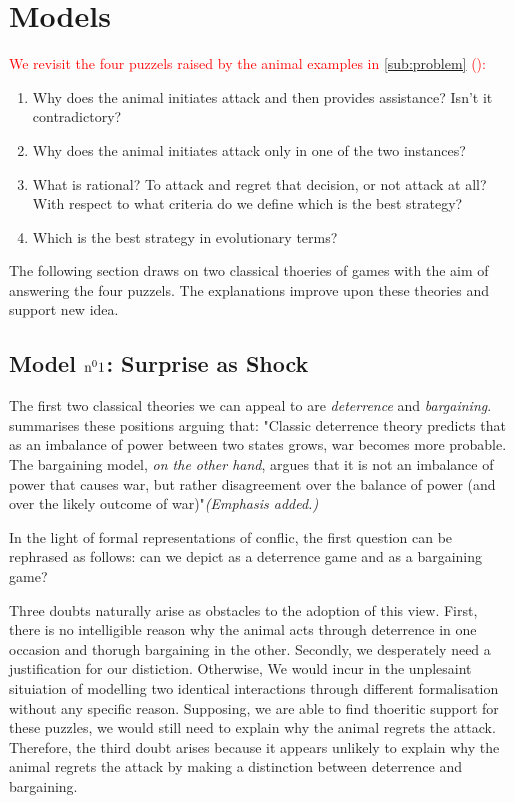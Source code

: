 
\section{Models}

\textcolor{red}{We revisit the four puzzels raised by the animal examples in \autoref{sub:problem} ():}

\begin{enumerate}
  \item Why does the animal initiates attack and then provides assistance? Isn't it contradictory?
  \item Why does the animal initiates attack only in one of the two instances?
  \item What is rational? To attack and regret that decision, or not attack at all? With respect to what criteria do we define which is the best strategy?
  \item Which is the best strategy in evolutionary terms?
\end{enumerate}

The following section draws on two classical thoeries of games with the aim of answering the four puzzels. The explanations improve upon these theories and support new idea.

\subsection{Model \(\text{n}^{{\small{0}}}1\): Surprise as Shock} \label{sub:model1}
The first two classical theories we can appeal to are \textit{deterrence} and \textit{bargaining}. \textcite{reiterExploringBargainingModel2003} summarises these positions arguing that: "Classic deterrence theory predicts that as an imbalance of power between two states grows, war becomes more probable. The bargaining model, \textit{on the other hand}, argues that it is not an imbalance of power that causes war, but rather disagreement over the balance of power (and over the likely outcome of war)"\textit{\small{(Emphasis added.)}}

\vspace*{1em}
In the light of formal representations of conflic, the first question can be rephrased as follows: can we depict  as a deterrence game and   as a bargaining game?

\vspace*{1em}
Three doubts naturally arise as obstacles to the adoption of this view.
First, there is no intelligible reason why the animal acts through deterrence in one occasion and thorugh bargaining in the other. Secondly, we desperately need a justification for our distiction. Otherwise, We would incur in the unplesaint situiation of modelling two identical interactions through different formalisation without any specific reason. Supposing, we are able to find thoeritic support for these puzzles, we would still need to explain why the animal regrets the attack. Therefore, the third doubt arises because it appears unlikely to explain why the animal regrets the attack by making a distinction between deterrence and bargaining.

